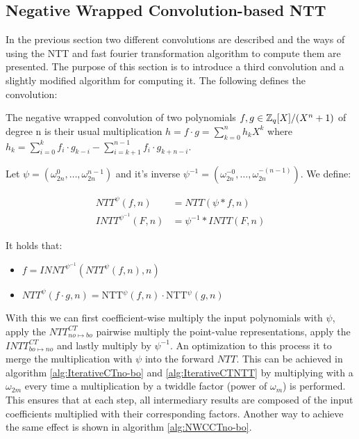 \subsection{Negative Wrapped Convolution-based NTT}

In the previous section two different convolutions are described and the ways of using the NTT and fast fourier transformation algorithm to compute them are presented. The purpose of this section is to introduce a third convolution and a slightly modified algorithm for computing it. The following defines the convolution: 

\begin{definition}
    The negative wrapped convolution of two polynomials $f, g \in \mathbb{Z}_q[X]/(X^n + 1)$ of degree n is their usual multiplication $h = f \cdot g = \sum_{k=0}^{n} h_k X^k$ where $h_k = \sum_{i=0}^k f_i \cdot g_{k-i} - \sum_{i=k+1}^{n-1} f_i \cdot g_{k + n - i}$.
\end{definition}

Let $\psi = (\omega_{2n}^0, \ldots, \omega_{2n}^{n-1})$ and it's inverse
$\psi^{-1} = (\omega_{2n}^{-0}, \ldots, \omega_{2n}^{-(n-1)})$. We define:

\begin{align*}
   NTT^\psi(f, n) &=NTT(\psi * f, n) \\
    INTT^{\psi^{-1}}(F, n) &= \psi^{-1} * INTT(F, n)
\end{align*}

It holds that:

\begin{itemize}
    \item $f = INNT^{\psi^{-1}}(NTT^\psi(f, n), n)$
    \item $NTT^\psi(f \cdot g, n) =$NTT$^\psi(f, n) \cdot$NTT$^\psi(g, n)$
\end{itemize}

With this we can first coefficient-wise multiply the input polynomials with $\psi$, apply the $NTT^{CT}_{no \mapsto bo}$ pairwise multiply the point-value representations, apply the $INTT^{CT}_{bo \mapsto no}$ and lastly multiply by $\psi^{-1}$. An optimization to this process it to merge the multiplication with $\psi$ into the forward $NTT$. This can be achieved in algorithm \cref{alg:IterativeCTno-bo} and \cref{alg:IterativeCTNTT} by multiplying with a $\omega_{2m}$ every time a multiplication by a twiddle factor (power of $\omega_m$) is performed. This ensures that at each step, all intermediary results are composed of the input coefficients multiplied with their corresponding factors. Another way to achieve the same effect is shown in algorithm \cref{alg:NWCCTno-bo}.

